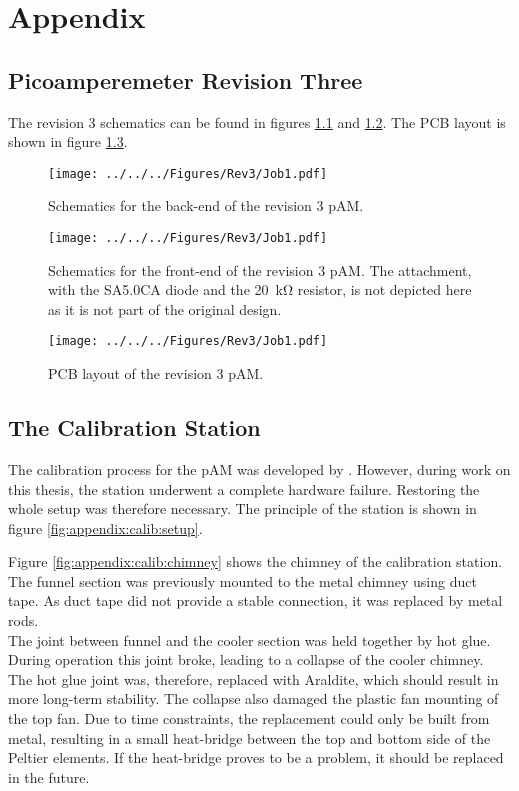 \chapter{Appendix}
\label{sec:app}
\section{Picoamperemeter Revision Three }
\label{sec:rev3}
The revision 3 schematics can be found in figures \ref{fig:rev3:schematics:backend} and \ref{fig:rev3:schematics:frontend}. The PCB layout is shown in figure \ref{fig:rev3:pcb}.
\begin{figure}
	\centering
	\texttt{[image: ../../../Figures/Rev3/Job1.pdf]}
	\caption{Schematics for the back-end of the revision 3 \ac{pAM}.}
	\label{fig:rev3:schematics:backend}
\end{figure}

\begin{figure}
	\centering
	\texttt{[image: ../../../Figures/Rev3/Job1.pdf]}
	\caption{Schematics for the front-end of the revision 3 \ac{pAM}. The attachment, with the SA5.0CA diode and the \SI{20}{\kilo\ohm} resistor, is not depicted here as it is not part of the original design.}
	\label{fig:rev3:schematics:frontend}
\end{figure}
\begin{figure}
	\centering
	\texttt{[image: ../../../Figures/Rev3/Job1.pdf]}
	\caption{PCB layout of the revision 3 \ac{pAM}.}
	\label{fig:rev3:pcb}
\end{figure}
\section{The Calibration Station}
The calibration process for the \ac{pAM} was developed by \cite{roedel}. However, during work on this thesis, the station underwent a complete hardware failure. Restoring the whole setup was therefore necessary. The principle of the station is shown in figure \ref{fig:appendix:calib:setup}.

Figure \ref{fig:appendix:calib:chimney} shows the chimney of the calibration station. The funnel section was previously mounted to the metal chimney using duct tape. As duct tape did not provide a stable connection, it was replaced by metal rods.\\
 The joint between funnel and the cooler section was held together by hot glue. During operation this joint broke, leading to a collapse of the cooler chimney. The hot glue joint was, therefore, replaced with Araldite, which should result in more long-term stability.
The collapse also damaged the plastic fan mounting of the top fan. Due to time constraints, the replacement could only be built from metal, resulting in a small heat-bridge between the top and bottom side of the Peltier elements. If the heat-bridge proves to be a problem, it should be replaced in the future.

